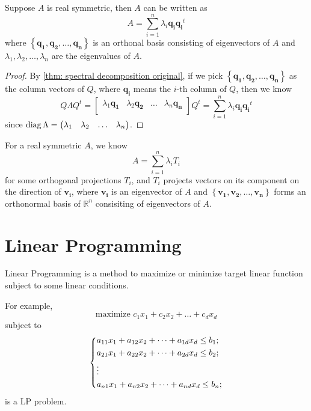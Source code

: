 \begin{theorem}
  Suppose \(A\) is real symmetric, then \(A\) can be written as 
  \[
    A = \sum_{i=1}^n \lambda _i \mathbf{q_i} \mathbf{q_i}^t    
  \]  
  where \(\left\{ \mathbf{q_1}, \mathbf{q_2}, \dots , \mathbf{q_n}  \right\} \)  is an orthonal basis consisting of eigenvectors of \(A\) and \(\lambda _1, \lambda _2, \dots , \lambda _n\) are the eigenvalues of \(A\). 
\end{theorem}
\begin{proof}
  By \autoref{thm: spectral decomposition original}, if we pick \(\left\{ \mathbf{q_1}, \mathbf{q_2}, \dots , \mathbf{q_n} \right\} \) as the column vectors of \(Q\), where \(\mathbf{q_i} \) means the \(i\)-th column of \(Q\), then we know 
  \[
    Q \Lambda Q^t = \begin{bmatrix}
      \lambda _1 \mathbf{q_1}  & \lambda _2 \mathbf{q_2}  & \dots  & \lambda _n \mathbf{q_n}   \\
    \end{bmatrix} Q^t = \sum_{i=1}^{n} \lambda _i \mathbf{q_i} \mathbf{q_i}^t
  \]     since \(\operatorname{diag} \Lambda = \begin{pmatrix}
    \lambda _1 & \lambda _2 & \dots  & \lambda _n  \\
  \end{pmatrix}\).
\end{proof}

\begin{corollary}
  For a real symmetric \(A\), we know 
  \[
    A = \sum _{i=1}^n \lambda _i T_i
  \] 
  for some orthogonal projections \(T_i\), and \(T_i\) projects vectors on its component on the direction of \(\mathbf{v_i} \), where \(\mathbf{v_i} \) is an eigenvector of \(A\) and \(\left\{ \mathbf{v_1}, \mathbf{v_2}, \dots , \mathbf{v_n} \right\} \) forms an orthonormal basis of \(\mathbb{R} ^n\)  consisiting of eigenvectors of \(A\). 
\end{corollary}

\section{Linear Programming} \label{appendix: LP}
\begin{definition}
  Linear Programming is a method to maximize or minimize target linear function subject to some linear conditions. 
\end{definition}

For example, 
\[
  \text{maximize } c_1 x_1 + c_2 x_2 + \dots + c_d x_d 
\]
subject to 
\[
  \begin{dcases}
    a_{11} x_1 + a_{12} x_2 + \dots + a_{1d} x_d \leq b_1;\\
    a_{21} x_1 + a_{22} x_2 + \dots + a_{2d} x_d \leq b_2;\\
    \vdots \\
    a_{n1} x_1 + a_{n2} x_2 + \dots + a_{nd} x_d \leq b_n;\\
  \end{dcases}
\]
is a LP problem.

